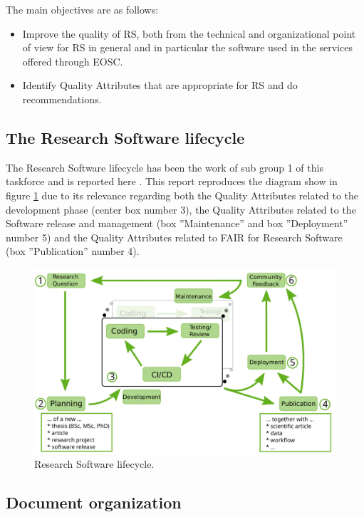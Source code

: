The main objectives are as follows:

\begin{itemize}
    \item Improve the quality of RS, both from the technical and organizational point of view for RS in general and in particular the software used in the services offered through EOSC.
    \item Identify Quality Attributes that are appropriate for RS and do recommendations.
\end{itemize}

\subsection{The Research Software lifecycle}

The Research Software lifecycle has been the work of sub group 1 of this taskforce and is reported here \cite{sg1tf2023}. This report reproduces the diagram show in figure \ref{fig:rslifecycle} due to its relevance regarding both the Quality Attributes related to the development phase (center box number 3), the Quality Attributes related to the Software release and management (box ''Maintenance'' and box ''Deployment'' number 5) and the Quality Attributes related to FAIR for Research Software (box ''Publication'' number 4).

\begin{figure}[h]
    \centering
    \includegraphics[width=0.90\linewidth]{imgs/rs_lifecycle.png}
    \caption{Research Software lifecycle.}
    \label{fig:rslifecycle}
\end{figure}

\subsection{Document organization}

